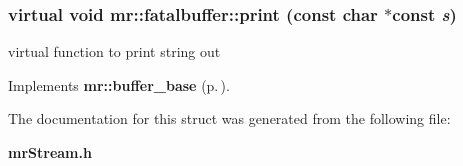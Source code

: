 \subsubsection{\setlength{\rightskip}{0pt plus 5cm}virtual void mr::fatalbuffer::print (const char $\ast$const {\em s})\hspace{0.3cm}{\tt  [inline, virtual]}}\label{structmr_1_1fatalbuffer_a1}


virtual function to print string out 



Implements {\bf mr::buffer\_\-base} {\rm (p.\,\pageref{structmr_1_1buffer__base_a3})}.

The documentation for this struct was generated from the following file:\begin{CompactItemize}
\item 
{\bf mr\-Stream.h}\end{CompactItemize}
